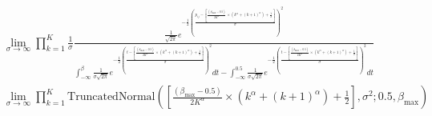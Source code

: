 \documentclass[11pt]{amsart}
\begin{document}
\begin{align}
&\lim_{\sigma \rightarrow \infty}  \prod_{k=1}^K  \frac{1}{\sigma} \frac{\frac{1}{\sqrt{2\pi}} e^{-\frac{1}{2}\left(\frac{p_{ij} - \left[ \frac{(\beta_{\max} - 0.5)}{2K^{\alpha}} \times  \left(  k^{\alpha} + (k+1)^{\alpha} \right) +\frac{1}{2}\right]  }{\sigma}\right)^2}}{\int_{-\infty}^\beta \frac{1}{\sigma\sqrt{2\pi}} e^{-\frac{1}{2}\left(\frac{t-  \left[ \frac{(\beta_{\max} - 0.5)}{2K^{\alpha}} \times  \left(  k^{\alpha} + (k+1)^{\alpha} \right) +\frac{1}{2} \right] }{\sigma}\right)^2 }dt -\int_{-\infty}^{0.5} \frac{1}{\sigma\sqrt{2\pi}} e^{-\frac{1}{2}\left(\frac{t-  \left[ \frac{(\beta_{\max} - 0.5)}{2K^{\alpha}} \times  \left(  k^{\alpha} + (k+1)^{\alpha} \right) +\frac{1}{2} \right] }{\sigma}\right)^2 }dt} \\
& \lim_{\sigma \rightarrow \infty} 
\prod_{k=1}^K  \text{TruncatedNormal}(\left[ \frac{(\beta_{\max} - 0.5)}{2K^{\alpha}} \times  \left(  k^{\alpha} + (k+1)^{\alpha} \right) +\frac{1}{2} \right], \sigma^{2}; 0.5, \beta_{\max})
\end{align}
\end{document}
